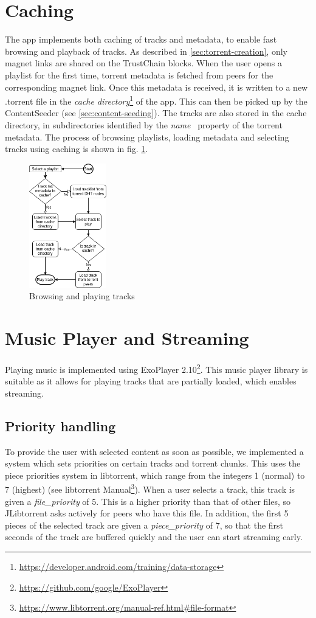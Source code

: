 \section{Caching}
The app implements both caching of tracks and metadata, to enable fast browsing and playback of tracks. As described in \ref{sec:torrent-creation}, only magnet links are shared on the TrustChain blocks. When the user opens a playlist for the first time, torrent metadata is fetched from peers for the corresponding magnet link. Once this metadata is received, it is written to a new .torrent file in the \textit{cache directory}\footnote{\url{https://developer.android.com/training/data-storage}} of the app. This can then be picked up by the ContentSeeder (see \ref{sec:content-seeding}). The tracks are also stored in the cache directory, in subdirectories identified by the \textit{name}~\citep{bittorrentbep3} property of the torrent metadata. The process of browsing playlists, loading metadata and selecting tracks using caching is shown in fig. \ref{fig:playing-tracks}.
\begin{figure}
    \includegraphics[width=0.3\textwidth]{implementation/playing_track.png}
    \caption{Browsing and playing tracks}
    \label{fig:playing-tracks}
\end{figure}

\section{Music Player and Streaming}
Playing music is implemented using ExoPlayer 2.10\footnote{\url{https://github.com/google/ExoPlayer}}. This music player library is suitable as it allows for playing tracks that are partially loaded, which enables streaming.
\subsection{Priority handling}
To provide the user with selected content as soon as possible, we implemented a system which sets priorities on certain tracks and torrent chunks. This uses the piece priorities system in libtorrent, which range from the integers 1 (normal) to 7 (highest) (see libtorrent Manual\footnote{\url{https://www.libtorrent.org/manual-ref.html\#file-format}}). When a user selects a track, this track is given a \textit{file\_priority} of 5. This is a higher priority than that of other files, so JLibtorrent asks actively for peers who have this file. In addition, the first 5  pieces of the selected track are given a \textit{piece\_priority} of 7, so that the first seconds of the track are buffered quickly and the user can start streaming early.
